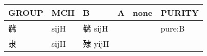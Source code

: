 \documentclass[14pt,a4paper]{scrartcl}
\begin{document}
\begin{longtable}[c]{@{}llllll@{}}
\toprule
\begin{minipage}[b]{0.14\columnwidth}\raggedright\strut
GROUP
\strut\end{minipage} &
\begin{minipage}[b]{0.14\columnwidth}\raggedright\strut
MCH
\strut\end{minipage} &
\begin{minipage}[b]{0.14\columnwidth}\raggedright\strut
B
\strut\end{minipage} &
\begin{minipage}[b]{0.14\columnwidth}\raggedright\strut
A
\strut\end{minipage} &
\begin{minipage}[b]{0.14\columnwidth}\raggedright\strut
none
\strut\end{minipage} &
\begin{minipage}[b]{0.14\columnwidth}\raggedright\strut
PURITY
\strut\end{minipage}\tabularnewline
\midrule
\endhead
\begin{minipage}[t]{0.14\columnwidth}\raggedright\strut
㣈
\strut\end{minipage} &
\begin{minipage}[t]{0.14\columnwidth}\raggedright\strut
sijH
\strut\end{minipage} &
\begin{minipage}[t]{0.14\columnwidth}\raggedright\strut
㣈 sijH
\strut\end{minipage} &
\begin{minipage}[t]{0.14\columnwidth}\raggedright\strut
\strut\end{minipage} &
\begin{minipage}[t]{0.14\columnwidth}\raggedright\strut
\strut\end{minipage} &
\begin{minipage}[t]{0.14\columnwidth}\raggedright\strut
pure:B
\strut\end{minipage}\tabularnewline
\begin{minipage}[t]{0.14\columnwidth}\raggedright\strut
隶
\strut\end{minipage} &
\begin{minipage}[t]{0.14\columnwidth}\raggedright\strut
sijH
\strut\end{minipage} &
\begin{minipage}[t]{0.14\columnwidth}\raggedright\strut
殔 yijH
\strut\end{minipage} &
\begin{minipage}[t]{0.14\columnwidth}\raggedright\strut

\end{minipage}
\end{longtable}
\end{document}
